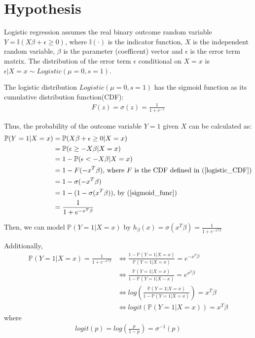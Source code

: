 \documentclass[12pt,a4paper]{article}
\begin{document}
\section{Hypothesis}

Logistic regression assumes the real binary outcome random variable
${Y = \mathbb{I}(X\beta + \epsilon \geq 0)}$, where
\(\mathbb{I}(\cdot)\) is the indicator function, $X$ is the
independent random variable, \(\beta\) is the parameter (coefficent)
vector and $\epsilon$ is the error term matrix. The distribution of
the error term $\epsilon$ conditional on $X=x$ is
$\epsilon | X=x \sim Logistic(\mu=0, s=1)$.

The logistic distribution $Logistic(\mu=0, s=1)$ has the sigmoid
function as its cumulative distribution function(CDF):
\begin{align}\label{logistic_CDF}
F(z)=\sigma(z)=\frac{1}{1+e^{-z}}
\end{align}

Thus, the probability of the outcome variable $Y=1$ given $X$ can be
calculated as: \begin{align}
\mathbb{P}(Y=1|X=x) &= \mathbb{P}(X\beta + \epsilon \geq 0|X=x)\\
&=\mathbb{P}(\epsilon \geq -X\beta|X=x)\\
&=1-\mathbb{P}(\epsilon < -X\beta|X=x)\\
&=1-F(-x^T\beta)\text{, where } F \text{ is the CDF defined in (\ref{logistic_CDF})}\\
&=1-\sigma(-x^T\beta)\\
&=1-(1-\sigma(x^T\beta))\text{, by (\ref{sigmoid_func})}\\
&=\frac{1}{1+e^{-x^T\beta}}
\end{align}

Then, we can model $\mathbb{P}(Y=1|X=x)$ by $h_\beta(x)=\sigma(x^T\beta)=\frac{1}{1+e^{-x^T\beta}}$

Additionally,
\begin{align}
\mathbb{P}(Y=1|X=x) = \frac{1}{1+e^{-x^T\beta}}&\iff \frac{1-\mathbb{P}(Y=1|X=x)}{\mathbb{P}(Y=1|X=x)} = e^{-x^T\beta}\\
&\iff \frac{\mathbb{P}(Y=1|X=x)}{1-\mathbb{P}(Y=1|X-x)} = e^{x^T\beta}\\
&\iff log(\frac{\mathbb{P}(Y=1|X=x)}{1-\mathbb{P}(Y=1|X=x)}) = x^T\beta\\
&\iff logit(\mathbb{P}(Y=1|X=x)) = x^T\beta
\end{align}
where
\begin{align}
logit(p) = log(\frac{p}{1-p}) = \sigma^{-1}(p)
\end{align}
\end{document}
